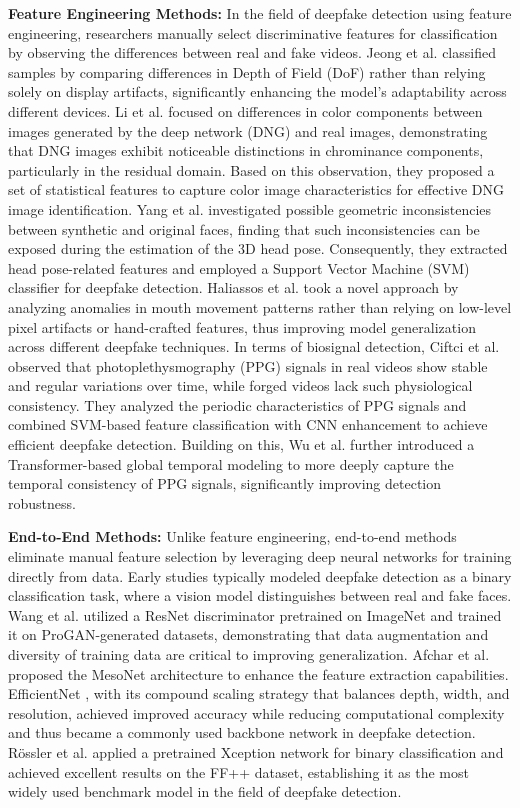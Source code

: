 \documentclass[final,5p,times]{elsarticle}
\begin{document}
\textbf{Feature Engineering Methods:} In the field of deepfake detection using feature engineering, researchers manually select discriminative features for classification by observing the differences between real and fake videos. Jeong et al. \cite{2} classified samples by comparing differences in Depth of Field (DoF) rather than relying solely on display artifacts, significantly enhancing the model's adaptability across different devices. Li et al. \cite{3} focused on differences in color components between images generated by the deep network (DNG) and real images, demonstrating that DNG images exhibit noticeable distinctions in chrominance components, particularly in the residual domain. Based on this observation, they proposed a set of statistical features to capture color image characteristics for effective DNG image identification. Yang et al. \cite{4} investigated possible geometric inconsistencies between synthetic and original faces, finding that such inconsistencies can be exposed during the estimation of the 3D head pose. Consequently, they extracted head pose-related features and employed a Support Vector Machine (SVM) classifier for deepfake detection. Haliassos et al. \cite{5} took a novel approach by analyzing anomalies in mouth movement patterns rather than relying on low-level pixel artifacts or hand-crafted features, thus improving model generalization across different deepfake techniques. In terms of biosignal detection, Ciftci et al. \cite{6} observed that photoplethysmography (PPG) signals in real videos show stable and regular variations over time, while forged videos lack such physiological consistency. They analyzed the periodic characteristics of PPG signals and combined SVM-based feature classification with CNN enhancement to achieve efficient deepfake detection. Building on this, Wu et al. \cite{7} further introduced a Transformer-based global temporal modeling to more deeply capture the temporal consistency of PPG signals, significantly improving detection robustness.

\textbf{End-to-End Methods:} Unlike feature engineering, end-to-end methods eliminate manual feature selection by leveraging deep neural networks for training directly from data. Early studies typically modeled deepfake detection as a binary classification task, where a vision model distinguishes between real and fake faces. Wang et al. \cite{22} utilized a ResNet discriminator pretrained on ImageNet and trained it on ProGAN-generated datasets, demonstrating that data augmentation and diversity of training data are critical to improving generalization. Afchar et al. \cite{23} proposed the MesoNet architecture to enhance the feature extraction capabilities. EfficientNet \cite{24}, with its compound scaling strategy that balances depth, width, and resolution, achieved improved accuracy while reducing computational complexity and thus became a commonly used backbone network in deepfake detection. Rössler et al. \cite{25} applied a pretrained Xception network for binary classification and achieved excellent results on the FF++ dataset, establishing it as the most widely used benchmark model in the field of deepfake detection.
\end{document}
